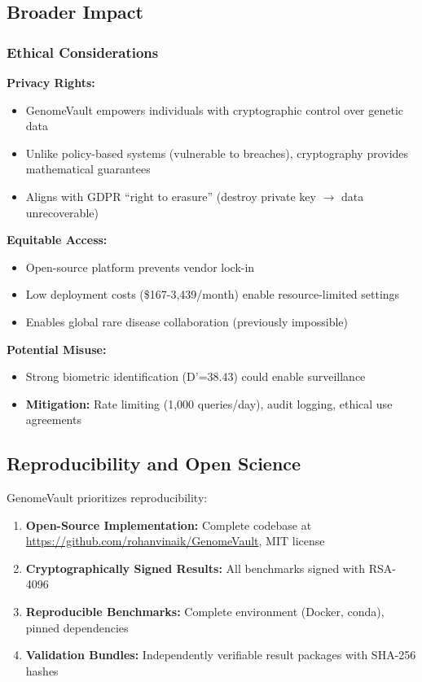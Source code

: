 \documentclass[11pt,a4paper]{article}
\begin{document}
\subsection{Broader Impact}

\subsubsection{Ethical Considerations}

\textbf{Privacy Rights:}
\begin{itemize}
    \item GenomeVault empowers individuals with cryptographic control over genetic data
    \item Unlike policy-based systems (vulnerable to breaches), cryptography provides mathematical guarantees
    \item Aligns with GDPR ``right to erasure'' (destroy private key $\rightarrow$ data unrecoverable)
\end{itemize}

\textbf{Equitable Access:}
\begin{itemize}
    \item Open-source platform prevents vendor lock-in
    \item Low deployment costs (\$167-3,439/month) enable resource-limited settings
    \item Enables global rare disease collaboration (previously impossible)
\end{itemize}

\textbf{Potential Misuse:}
\begin{itemize}
    \item Strong biometric identification (D'=38.43) could enable surveillance
    \item \textbf{Mitigation:} Rate limiting (1,000 queries/day), audit logging, ethical use agreements
\end{itemize}

\subsection{Reproducibility and Open Science}

GenomeVault prioritizes reproducibility:

\begin{enumerate}
    \item \textbf{Open-Source Implementation:} Complete codebase at \url{https://github.com/rohanvinaik/GenomeVault}, MIT license
    \item \textbf{Cryptographically Signed Results:} All benchmarks signed with RSA-4096
    \item \textbf{Reproducible Benchmarks:} Complete environment (Docker, conda), pinned dependencies
    \item \textbf{Validation Bundles:} Independently verifiable result packages with SHA-256 hashes
\end{enumerate}
\end{document}
